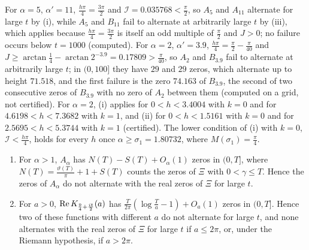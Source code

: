 For $\alpha=5$, $\alpha'=11$, $\frac{h\pi}4=\frac{3\pi}2$ and $\mathcal I=0.035768<\frac\pi2$, so $A_5$ and $A_{11}$ alternate for large $t$ by (i), while $A_5$ and $B_{11}$ fail to alternate at arbitrarily large $t$ by (iii), which applies because $\frac{h\pi}4=\frac{3\pi}2$ is itself an odd multiple of $\frac\pi2$ and $J>0$; no failure occurs below $t=1000$ (computed). For $\alpha=2$, $\alpha'=3.9$, $\frac{h\pi}4=\frac\pi2-\frac\pi{40}$ and $J\ge\arctan\frac14-\arctan2^{-3.9}=0.17809>\frac\pi{40}$, so $A_2$ and $B_{3.9}$ fail to alternate at arbitrarily large $t$; in $(0,100]$ they have $29$ and $29$ zeros, which alternate up to height $71.518$, and the first failure is the zero $74.163$ of $B_{3.9}$, the second of two consecutive zeros of $B_{3.9}$ with no zero of $A_2$ between them (computed on a grid, not certified). For $\alpha=2$, (i) applies for $0<h<3.4004$ with $k=0$ and for $4.6198<h<7.3682$ with $k=1$, and (ii) for $0<h<1.5161$ with $k=0$ and for $2.5695<h<5.3744$ with $k=1$ (certified). The lower condition of (i) with $k=0$, $\mathcal I<\frac{h\pi}4$, holds for every $h$ once $\alpha\ge\sigma_1=1.80732$, where $M(\sigma_1)=\frac\pi4$.

\begin{proposition}\label{mi:prop:noninter}
\begin{enumerate}
\item[(i)] For $\alpha>1$, $A_\alpha$ has $N(T)-S(T)+O_\alpha(1)$ zeros in $(0,T]$, where $N(T)=\frac{\vartheta(T)}\pi+1+S(T)$ counts the zeros of $\Xi$ with $0<\gamma\le T$. Hence the zeros of $A_\alpha$ do not alternate with the real zeros of $\Xi$ for large $t$.
\item[(ii)] For $a>0$, $\operatorname{Re} K_{\frac94+\frac{it}2}(a)$ has $\frac T{2\pi}(\log\frac Ta-1)+O_a(1)$ zeros in $(0,T]$. Hence two of these functions with different $a$ do not alternate for large $t$, and none alternates with the real zeros of $\Xi$ for large $t$ if $a\le2\pi$, or, under the Riemann hypothesis, if $a>2\pi$.
\end{enumerate}
\end{proposition}


